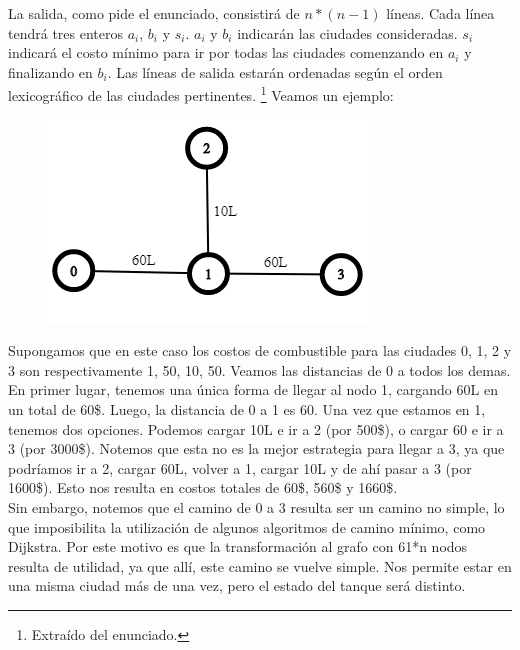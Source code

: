 \indent La salida, como pide el enunciado, consistirá de $n*(n-1)$ líneas. Cada línea tendrá tres enteros $a_{i}$, $b_{i}$ y $s_{i}$. $a_{i}$ y $b_{i}$ indicarán las ciudades consideradas. $s_{i}$ indicará el costo mínimo para ir por todas las ciudades comenzando en $a_{i}$ y finalizando en $b_{i}$. Las líneas de salida estarán ordenadas según el orden lexicográfico de las ciudades pertinentes. \footnote{Extraído del enunciado.}
Veamos un ejemplo:

\begin{center}
\begin{figure}[H]
\centering
   \begin{minipage}{0.4\textwidth}
     \centering
     \includegraphics[width=1\linewidth]{img/graph_intro.png}
   \end{minipage}\hfill
\end{figure}
\end{center}

\indent Supongamos que en este caso los costos de combustible para las ciudades 0, 1, 2 y 3 son respectivamente 1, 50, 10, 50. Veamos las distancias de 0 a todos los demas. En primer lugar, tenemos una única forma de llegar al nodo 1, cargando 60L en un total de 60\$. Luego, la distancia de 0 a 1 es 60. Una vez que estamos en 1, tenemos dos opciones. Podemos cargar 10L e ir a 2 (por 500\$), o cargar 60 e ir a 3 (por 3000\$). Notemos que esta no es la mejor estrategia para llegar a 3, ya que podríamos ir a 2, cargar 60L, volver a 1, cargar 10L y de ahí pasar a 3 (por 1600\$). Esto nos resulta en costos totales de 60\$, 560\$ y 1660\$. \\
\indent Sin embargo, notemos que el camino de 0 a 3 resulta ser un camino no simple, lo que imposibilita la utilización de algunos algoritmos de camino mínimo, como Dijkstra. Por este motivo es que la transformación al grafo con 61*n nodos resulta de utilidad, ya que allí, este camino se vuelve simple. Nos permite estar en una misma ciudad más de una vez, pero el estado del tanque será distinto.
